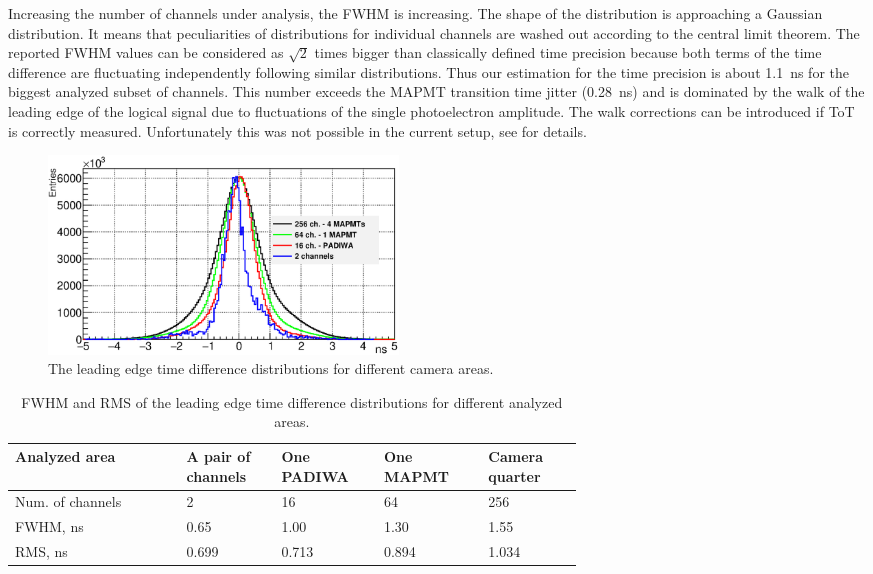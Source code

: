 \documentclass[final,5p,times,twocolumn]{elsarticle}
\begin{document}
Increasing the number of channels under analysis, the FWHM is increasing. The shape of the distribution is approaching a Gaussian distribution. It means that peculiarities of distributions for individual channels are washed out according to the central limit theorem. The reported FWHM values can be considered as $ \sqrt 2 $ times bigger than classically defined time precision because both terms of the time difference are fluctuating independently following similar distributions. Thus our estimation for the time precision is about 1.1~ns for the biggest analyzed subset of channels. This number exceeds the MAPMT transition time jitter (0.28~ns) and is dominated by the walk of the leading edge of the logical signal due to fluctuations of the single photoelectron amplitude. The walk corrections can be introduced if ToT is correctly measured. Unfortunately this was not possible in the current setup, see \cite{PEPAN} for details.

\begin{figure}[tbh]
	\centering
	\includegraphics[width=0.45\textwidth]{figures/TimePrecision_evolution_laser_WLSoff_color.eps}
	\caption{The leading edge time difference distributions for different camera areas.}
	\label{fig:TimePrec}
\end{figure}

\begin{table}[tbh]
\centering
	\begin{tabular}{ | p{0.22\linewidth} | p{0.10\linewidth} | p{0.10\linewidth} | p{0.12\linewidth} | p{0.12\linewidth} | }
		\hline		
		\scriptsize{Analyzed area} & \scriptsize{A pair of channels} & \scriptsize{One PADIWA} & \scriptsize{One MAPMT} & \scriptsize{Camera quarter} \\
		\hline
		\scriptsize{Num. of channels} & 2 & 16 & 64 & 256\\
		\hline
		\scriptsize{FWHM, ns} & 0.65 & 1.00 & 1.30 & 1.55\\
		\hline
		\scriptsize{RMS, ns} & 0.699 & 0.713 & 0.894 & 1.034\\
		\hline
	\end{tabular}

	\caption{FWHM and RMS of the leading edge time difference distributions for different analyzed areas.}
	\label{tabl:TimePrecTable}

\end{table}
\end{document}
